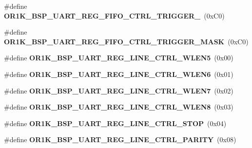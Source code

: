 \begin{DoxyCompactItemize}
\#define {\bfseries O\+R1\+K\+\_\+\+B\+S\+P\+\_\+\+U\+A\+R\+T\+\_\+\+R\+E\+G\+\_\+\+F\+I\+F\+O\+\_\+\+C\+T\+R\+L\+\_\+\+T\+R\+I\+G\+G\+E\+R\+\_}~(0x\+C0)
\item 
\mbox{\label{group__generic__or1k__reg_gac2718cf3585fc8a05db4cbc293d5696b}} 
\#define {\bfseries O\+R1\+K\+\_\+\+B\+S\+P\+\_\+\+U\+A\+R\+T\+\_\+\+R\+E\+G\+\_\+\+F\+I\+F\+O\+\_\+\+C\+T\+R\+L\+\_\+\+T\+R\+I\+G\+G\+E\+R\+\_\+\+M\+A\+SK}~(0x\+C0)
\item 
\mbox{\label{group__generic__or1k__reg_gaf4ae644167535fb9985ddaffa049adad}} 
\#define {\bfseries O\+R1\+K\+\_\+\+B\+S\+P\+\_\+\+U\+A\+R\+T\+\_\+\+R\+E\+G\+\_\+\+L\+I\+N\+E\+\_\+\+C\+T\+R\+L\+\_\+\+W\+L\+E\+N5}~(0x00)
\item 
\mbox{\label{group__generic__or1k__reg_ga81a3fed2e1ba7392b1d4eda6c8abfa95}} 
\#define {\bfseries O\+R1\+K\+\_\+\+B\+S\+P\+\_\+\+U\+A\+R\+T\+\_\+\+R\+E\+G\+\_\+\+L\+I\+N\+E\+\_\+\+C\+T\+R\+L\+\_\+\+W\+L\+E\+N6}~(0x01)
\item 
\mbox{\label{group__generic__or1k__reg_gac66e774d4f2039c5a104d4e90c1c7a47}} 
\#define {\bfseries O\+R1\+K\+\_\+\+B\+S\+P\+\_\+\+U\+A\+R\+T\+\_\+\+R\+E\+G\+\_\+\+L\+I\+N\+E\+\_\+\+C\+T\+R\+L\+\_\+\+W\+L\+E\+N7}~(0x02)
\item 
\mbox{\label{group__generic__or1k__reg_gaf0a45298ae43859e1a43c6a5eb9ac0b9}} 
\#define {\bfseries O\+R1\+K\+\_\+\+B\+S\+P\+\_\+\+U\+A\+R\+T\+\_\+\+R\+E\+G\+\_\+\+L\+I\+N\+E\+\_\+\+C\+T\+R\+L\+\_\+\+W\+L\+E\+N8}~(0x03)
\item 
\mbox{\label{group__generic__or1k__reg_ga29b3765f484a661f4a3bcff0d7c5d812}} 
\#define {\bfseries O\+R1\+K\+\_\+\+B\+S\+P\+\_\+\+U\+A\+R\+T\+\_\+\+R\+E\+G\+\_\+\+L\+I\+N\+E\+\_\+\+C\+T\+R\+L\+\_\+\+S\+T\+OP}~(0x04)
\item 
\mbox{\label{group__generic__or1k__reg_gabf902dbddadfaa684e0cc7c7397796b3}} 
\#define {\bfseries O\+R1\+K\+\_\+\+B\+S\+P\+\_\+\+U\+A\+R\+T\+\_\+\+R\+E\+G\+\_\+\+L\+I\+N\+E\+\_\+\+C\+T\+R\+L\+\_\+\+P\+A\+R\+I\+TY}~(0x08)
\item 
\mbox{\label{group__generic__or1k__reg_ga891a1e7a8e06e71273d4fc59dffbadf5}} 

\end{DoxyCompactItemize}
